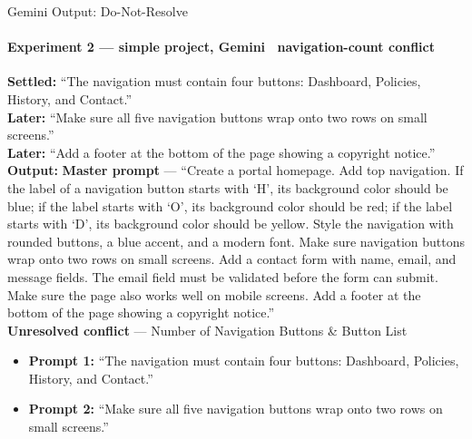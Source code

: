 \documentclass[aspectratio=169,11pt,c]{beamer}
\begin{document}
\begin{frame}{Gemini Output: Do-Not-Resolve}
  \framesubtitle{Experiment 2 --- simple project, Gemini \textperiodcentered\ navigation-count conflict}
  \begin{quotebox}
    \scriptsize
    \textbf{\color{primaryblue}Settled:} ``The navigation must contain four buttons: Dashboard, Policies, History, and Contact.''\\[1pt]
    \textbf{\color{primaryblue}Later:} ``Make sure all five navigation buttons wrap onto two rows on small screens.''\\[1pt]
    \textbf{\color{primaryblue}Later:} ``Add a footer at the bottom of the page showing a copyright notice.''\\[2pt]
    \textbf{\color{primaryblue}Output:} \textbf{Master prompt} --- ``Create a portal homepage. Add top navigation. If the label of a navigation button starts with `H', its background color should be blue; if the label starts with `O', its background color should be red; if the label starts with `D', its background color should be yellow. Style the navigation with rounded buttons, a blue accent, and a modern font. Make sure navigation buttons wrap onto two rows on small screens. Add a contact form with name, email, and message fields. The email field must be validated before the form can submit. Make sure the page also works well on mobile screens. Add a footer at the bottom of the page showing a copyright notice.''\\[2pt]
    \textbf{Unresolved conflict} --- Number of Navigation Buttons \& Button List
    \vspace{-3pt}
    \begin{itemize}\scriptsize
      \item \textbf{Prompt 1:} ``The navigation must contain four buttons: Dashboard, Policies, History, and Contact.''
      \item \textbf{Prompt 2:} ``Make sure all five navigation buttons wrap onto two rows on small screens.''
    \end{itemize}
  \end{quotebox}
\end{frame}
\end{document}
